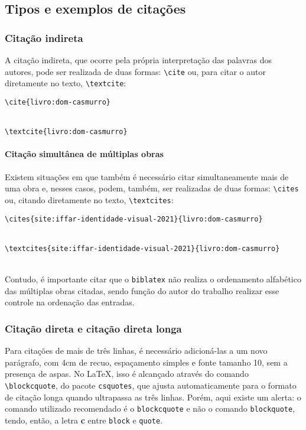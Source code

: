 \subsection{Tipos e exemplos de citações}
\subsubsection{Citação indireta}
A citação indireta, que ocorre pela própria interpretação das palavras dos autores, pode ser realizada de duas formas: \verb|\cite| ou, para citar o autor diretamente no texto, \verb|\textcite|:

\verb|\cite{livro:dom-casmurro}|

\cite{livro:dom-casmurro}\\

\verb|\textcite{livro:dom-casmurro}|

\textcite{livro:dom-casmurro}

\paragraph{Citação simultânea de múltiplas obras}
Existem situações em que também é necessário citar simultaneamente mais de uma obra e, nesses casos, podem, também, ser realizadas de duas formas: \verb|\cites| ou, citando diretamente no texto, \verb|\textcites|:

\verb|\cites{site:iffar-identidade-visual-2021}{livro:dom-casmurro}|

\cites{site:iffar-identidade-visual-2021}{livro:dom-casmurro}\\

\verb|\textcites{site:iffar-identidade-visual-2021}{livro:dom-casmurro}|

\textcites{site:iffar-identidade-visual-2021}{livro:dom-casmurro}\\

Contudo, é importante citar que o \verb|biblatex| não realiza o ordenamento alfabético das múltiplas obras citadas, sendo função do autor do trabalho realizar esse controle na ordenação das entradas.

\subsubsection{Citação direta e citação direta longa}
Para citações de mais de três linhas, é necessário adicioná-las a um novo parágrafo, com 4cm de recuo, espaçamento simples e fonte tamanho 10, sem a presença de aspas. No \LaTeX, isso é alcançado através do comando \verb|\blockcquote|, do pacote \verb|csquotes|, que ajusta automaticamente para o formato de citação longa quando ultrapassa as três linhas. Porém, aqui existe um alerta: o comando utilizado recomendado é o \texttt{blockcquote} e não o comando \texttt{blockquote}, tendo, então, a letra \textbf{c} entre \texttt{block} e \texttt{quote}.

